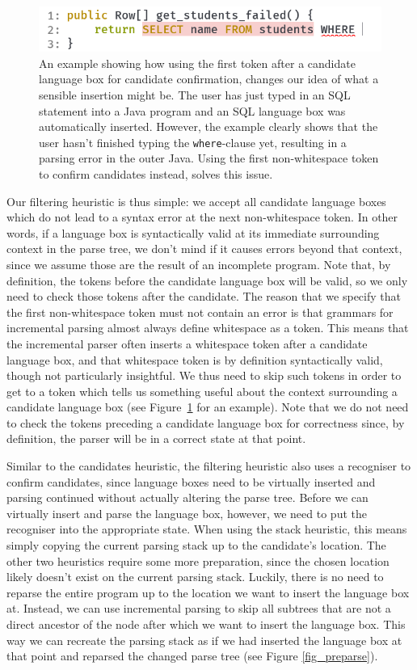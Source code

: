 \documentclass[sigplan,screen]{acmart}\settopmatter{printfolios=true,printccs=false,printacmref=false}
\begin{document}
\begin{figure}[tb]
\includegraphics[scale=1.5]{images/whitespace.png}
\caption{An example showing how using the first token after a candidate
language box for candidate confirmation, changes our idea of what a
sensible insertion might be.  The user has just typed in an SQL statement
into a Java program and an SQL language box was automatically inserted.
However, the example clearly shows that the user hasn't finished typing the
\texttt{where}-clause yet, resulting in a parsing error in the outer Java.
Using the first non-whitespace token to confirm candidates instead, solves
this issue.}
\label{fig:autobox_nonwhitespace}
\end{figure}

Our filtering heuristic is thus simple: we accept all candidate language
boxes which do not lead to a syntax error at the next non-whitespace token. In other
words, if a language box is syntactically valid at its immediate surrounding
context in the parse tree, we don't mind if it causes errors beyond that
context, since we assume those are the result of an
incomplete program. Note that, by definition, the tokens before the candidate
language box will be valid, so we only need to check those tokens after the
candidate. The reason that we specify that the first non-whitespace
token must not contain an error is that grammars for incremental parsing almost
always define whitespace as a token. This means that the incremental parser
often inserts a whitespace token after a candidate language box, and that
whitespace token is by definition syntactically valid, though not particularly
insightful. We thus need to skip such tokens in order to get to a
token which tells us something useful about the context surrounding a candidate
language box (see Figure~\ref{fig:autobox_nonwhitespace} for an example).
Note that we do not need to check the tokens preceding a candidate language box
for correctness since, by definition, the parser will be in a correct state
at that point.

Similar to the candidates heuristic, the filtering heuristic also uses a
recogniser to confirm candidates, since language boxes need to be virtually
inserted and parsing continued without actually altering the parse tree. Before
we can virtually insert and parse the language box, however, we need to put the
recogniser into the appropriate state. When using the stack heuristic, this
means simply copying the current parsing stack up to the candidate's location.
The other two heuristics require some more preparation, since the chosen
location likely doesn't exist on the current parsing stack. Luckily, there is
no need to reparse the entire program up to the location we want to insert the
language box at. Instead, we can use incremental parsing to skip all subtrees
that are not a direct ancestor of the node after which we want to insert the
language box. This way we can recreate the parsing stack as if we had inserted
the language box at that point and reparsed the changed parse tree (see Figure
\ref{fig_preparse}).
\end{document}
